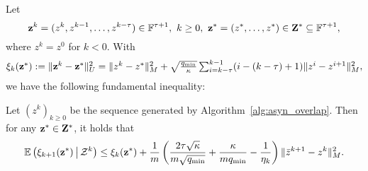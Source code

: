 Let 
\begin{equation*}%
\vz^k=(z^k,z^{k-1},\ldots,z^{k-\tau})\in \FF^{\tau+1},~k\ge 0,~\vz^* =(z^*,\ldots,z^*)\in\vZ^*\subseteq\FF^{\tau+1},
\end{equation*}
where $z^{k}=z^{0}$ for $k<0$. With
\begin{equation}\label{eqn:xi}
\textstyle \xi_k(\vz^*) := \|\vz^k-\vz^*\|_U^2=\|z^{k} - z^*\|_M^2 +
\sqrt{q_{\min}\over \kappa}\sum_{i=k-\tau}^{k-1} (i-(k-\tau)+1) \|
z^{i} - z^{i+1}\|_M^2,
\end{equation}
we have the following fundamental inequality:
\begin{thm}\label{thm:fund_inquality}
Let $(z^k)_{k\geq 0}$ be the sequence generated by Algorithm~\ref{alg:asyn_overlap}. Then for any ${\mathbf{z}}^*\in{\mathbf{Z}}^*$, it holds that %
\begin{equation}\label{eqn:fund_inquality}
\begin{aligned}
\mathbb{E}\left(\xi_{k+1}(\vz^*) \,\big|\, \cZ^k\right)  
\leq  \xi_k(\vz^*)  + \frac{1}{m}
\left(\frac{2\tau\sqrt{\kappa}}{m\sqrt{q_{\min}}} +
{\kappa\over mq_{\min}} - \frac{1}{ \eta_k}\right)
\|\bar{z}^{k+1} - z^k \|_M^2.
\end{aligned}
\end{equation}
\end{thm}

